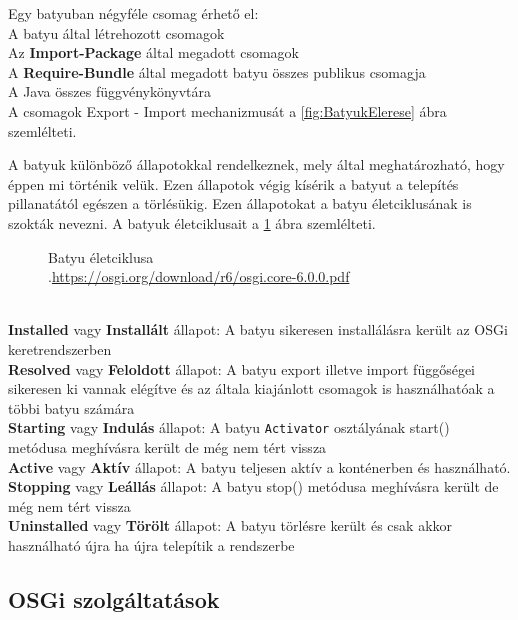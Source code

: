 Egy batyuban négyféle csomag érhető el:
\\A batyu által létrehozott csomagok
\\Az \textbf{Import-Package} által megadott csomagok
\\A \textbf{Require-Bundle} által megadott batyu összes publikus csomagja
\\A Java összes függvénykönyvtára
\\A csomagok Export - Import mechanizmusát a \ref{fig:BatyukElerese} ábra szemlélteti. 

\pagebreak


 A batyuk különböző állapotokkal rendelkeznek, mely által meghatározható, hogy éppen mi történik velük. Ezen állapotok végig kísérik a batyut a telepítés pillanatától egészen a törlésükig. Ezen állapotokat a batyu életciklusának is szokták nevezni. A batyuk életciklusait a \ref{fig:BatyukEletciklusa} ábra szemlélteti.
\\
\begin{figure}[h!]
  \centering
  \caption[Batyuk eletciklusa]%
  {Batyu életciklusa\\
  {\white .}\hfill\url{https://osgi.org/download/r6/osgi.core-6.0.0.pdf}}
  \label{fig:BatyukEletciklusa}
\end{figure}
\\\textbf{Installed} vagy \textbf{Installált} állapot: A batyu sikeresen installálásra került az OSGi keretrendszerben
\\\textbf{Resolved} vagy \textbf{Feloldott} állapot: A batyu export illetve import függőségei sikeresen ki vannak elégítve és az általa kiajánlott csomagok is használhatóak a többi batyu számára
\\\textbf{Starting} vagy \textbf{Indulás} állapot: A batyu \texttt{Activator} osztályának start() metódusa meghívásra került de még nem tért vissza
\\\textbf{Active} vagy \textbf{Aktív} állapot: A batyu teljesen aktív a konténerben és használható.
\\\textbf{Stopping} vagy \textbf{Leállás} állapot: A batyu stop() metódusa meghívásra került de még nem tért vissza
\\\textbf{Uninstalled} vagy \textbf{Törölt} állapot: A batyu törlésre került és csak akkor használható újra ha újra telepítik a rendszerbe

\subsection{OSGi szolgáltatások}

